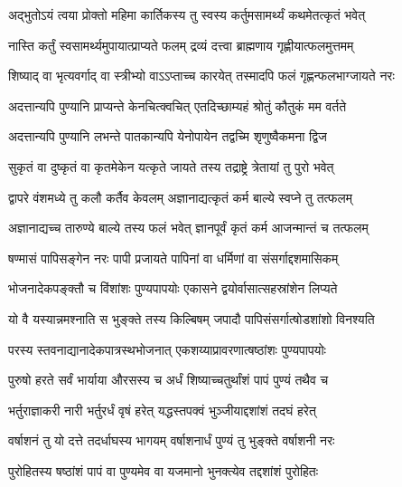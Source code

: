 


\twolineshloka
{अद्भुतोऽयं त्वया प्रोक्तो महिमा कार्तिकस्य तु}
{स्वस्य कर्तुमसामर्थ्यं कथमेतत्कृतं भवेत्} %


\twolineshloka
{नास्ति कर्तुं स्वसामर्थ्यमुपायात्प्राप्यते फलम्}
{द्रव्यं दत्त्वा ब्राह्मणाय गृह्णीयात्फलमुत्तमम्} %

\twolineshloka
{शिष्याद् वा भृत्यवर्गाद् वा स्त्रीभ्यो वाऽऽप्ताच्च कारयेत्}
{तस्मादपि फलं गृह्णन्फलभाग्जायते नरः} %


\twolineshloka
{अदत्तान्यपि पुण्यानि प्राप्यन्ते केनचित्क्वचित्}
{एतदिच्छाम्यहं श्रोतुं कौतुकं मम वर्तते} %


\twolineshloka
{अदत्तान्यपि पुण्यानि लभन्ते पातकान्यपि}
{येनोपायेन तद्वच्मि शृणुष्वैकमना द्विज} %

\twolineshloka
{सुकृतं वा दुष्कृतं वा कृतमेकेन यत्कृते}
{जायते तस्य तद्राष्ट्रे त्रेतायां तु पुरो भवेत्} %

\twolineshloka
{द्वापरे वंशमध्ये तु कलौ कर्तैव केवलम्}
{अज्ञानाद्यत्कृतं कर्म बाल्ये स्वप्ने तु तत्फलम्} %

\twolineshloka
{अज्ञानाद्यच्च तारुण्ये बाल्ये तस्य फलं भवेत्}
{ज्ञानपूर्वं कृतं कर्म आजन्मान्तं च तत्फलम्} %

\twolineshloka
{षण्मासं पापिसङ्गेन नरः पापी प्रजायते}
{पापिनां वा धर्मिणां वा संसर्गाद्दशमासिकम्} %

\twolineshloka
{भोजनादेकपङ्क्तौ च विंशांशः पुण्यपापयोः}
{एकासने द्वयोर्वासात्सहस्रांशेन लिप्यते} %

\twolineshloka
{यो वै यस्यान्नमश्नाति स भुङ्क्ते तस्य किल्बिषम्}
{जपादौ पापिसंसर्गात्षोडशांशो विनश्यति} %

\twolineshloka
{परस्य स्तवनाद्यानादेकपात्रस्थभोजनात्}
{एकशय्याप्रावरणात्षष्ठांशः पुण्यपापयोः} %

\twolineshloka
{पुरुषो हरते सर्वं भार्याया औरसस्य च}
{अर्धं शिष्याच्चतुर्थांशं पापं पुण्यं तथैव च} %

\twolineshloka
{भर्तुराज्ञाकरी नारी भर्तुरर्धं वृषं हरेत्}
{यद्धस्तपक्वं भुञ्जीयाद्दशांशं तदघं हरेत्} %

\twolineshloka
{वर्षाशनं तु यो दत्ते तदर्धाघस्य भागयम्}
{वर्षाशनार्धं पुण्यं तु भुङ्क्ते वर्षाशनी नरः} %

\twolineshloka
{पुरोहितस्य षष्ठांशं पापं वा पुण्यमेव वा}
{यजमानो भुनक्त्येव तद्दशांशं पुरोहितः} %


